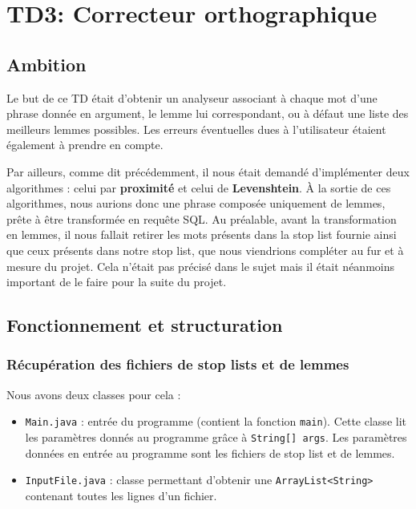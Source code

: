 \chapter{TD3: Correcteur orthographique}

\section{Ambition}

Le but de ce TD était d'obtenir un analyseur associant à chaque mot d'une phrase donnée en argument, le lemme lui correspondant, ou à défaut une liste des meilleurs lemmes possibles. Les erreurs éventuelles dues à l'utilisateur étaient également à prendre en compte.

\medskip

Par ailleurs, comme dit précédemment, il nous était demandé d'implémenter deux algorithmes : celui par \textbf{proximité} et celui de \textbf{Levenshtein}. À la sortie de ces algorithmes, nous aurions donc une phrase composée uniquement de lemmes, prête à être transformée en requête SQL. Au préalable, avant la transformation en lemmes, il nous fallait retirer les mots présents dans la stop list fournie ainsi que ceux présents dans notre stop list, que nous viendrions compléter au fur et à mesure du projet. Cela n'était pas précisé dans le sujet mais il était néanmoins important de le faire pour la suite du projet.

\section{Fonctionnement et structuration}

\subsection{Récupération des fichiers de stop lists et de lemmes}

Nous avons deux classes pour cela :

\java
\begin{itemize}
    \item \lstinline{Main.java} : entrée du programme (contient la fonction \lstinline{main}). Cette classe lit les paramètres donnés au programme grâce à \lstinline{String[] args}. Les paramètres données en entrée au programme sont les fichiers de stop list et de lemmes.
    \item \lstinline{InputFile.java} : classe permettant d'obtenir une \lstinline{ArrayList<String>} contenant toutes les lignes d'un fichier.
\end{itemize}

